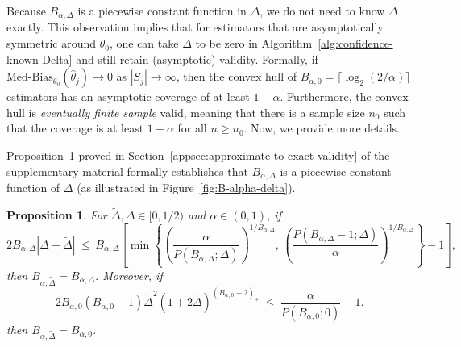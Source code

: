 \documentclass{article}
\newtheorem{prop}{Proposition}
\numberwithin{myalgctr}{section}
\begin{document}
Because $B_{\alpha,\Delta}$ is a piecewise constant function in $\Delta$, we do not need to know $\Delta$ exactly. 
This observation implies that for estimators that are asymptotically symmetric around $\theta_0$, one can take $\Delta$ to be zero in Algorithm~\ref{alg:confidence-known-Delta} and still retain (asymptotic) validity. Formally, if $\mbox{Med-Bias}_{\theta_0}(\widehat{\theta}_j) \to 0$ as $|S_j|\to\infty$, then the convex hull of $B_{\alpha,0} = \lceil\log_2(2/\alpha)\rceil$ estimators has an asymptotic coverage of at least $1 - \alpha$. Furthermore, the convex hull is \emph{eventually finite sample} valid, meaning that there is a sample size $n_0$ such that the coverage is at least $1 - \alpha$ for all $n\ge n_0$. Now, we provide more details. 

Proposition~\ref{prop:approximate-to-exact-validity} proved in Section~\ref{appsec:approximate-to-exact-validity} of the supplementary material formally establishes that $B_{\alpha,\Delta}$ is a piecewise constant function of $\Delta$ (as illustrated in 
Figure~\ref{fig:B-alpha-delta}).
\begin{prop}\label{prop:approximate-to-exact-validity}
For $\widetilde{\Delta}, \Delta\in[0, 1/2)$ and $\alpha\in(0, 1)$, if
\begin{equation}\label{eq:consistency-subsampling}
2B_{\alpha,\Delta}|\Delta - \widetilde{\Delta}| ~\le~ B_{\alpha,\Delta}\left[\min\left\{\left(\frac{\alpha}{P(B_{\alpha,\Delta};\Delta)}\right)^{1/B_{\alpha,\Delta}},\,\left(\frac{P(B_{\alpha,\Delta} - 1; \Delta)}{\alpha}\right)^{1/B_{\alpha,\Delta}}\right\} - 1\right],
\end{equation}
then $B_{\alpha, \widetilde{\Delta}} = B_{\alpha, \Delta}.$ Moreover, if
\begin{equation}\label{eq:consistency-subsampling-asymptotic-median-unbiased}
2B_{\alpha,0}(B_{\alpha,0} - 1)\widetilde{\Delta}^2(1 + 2\widetilde{\Delta})^{(B_{\alpha,0} - 2)_+}
~\le~ \frac{\alpha}{P(B_{\alpha,0}; 0)} - 1.
\end{equation}
then $B_{\alpha,\widetilde{\Delta}} = B_{\alpha,0}$.
\end{prop}
\end{document}
